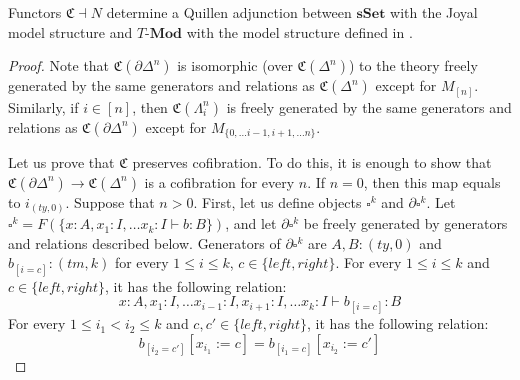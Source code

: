 \documentclass[reqno]{amsart}
\theoremstyle{definition}
\theoremstyle{remark}
\newcommand{\repl}{:=}
\newcommand{\cat}[1]{\mathbf{#1}}
\newcommand{\Mod}[1]{#1\text{-}\cat{Mod}}
\newcommand{\sSet}{\cat{sSet}}
\numberwithin{figure}{section}
\begin{document}
\begin{prop}
Functors $\mathfrak{C} \dashv N$ determine a Quillen adjunction between $\sSet$ with the Joyal model structure and $\Mod{T}$ with the model structure defined in \cite{alg-models}.
\end{prop}
\begin{proof}
Note that $\mathfrak{C}(\partial \Delta^n)$ is isomorphic (over $\mathfrak{C}(\Delta^n)$) to the theory
freely generated by the same generators and relations as $\mathfrak{C}(\Delta^n)$ except for $M_{[n]}$.
Similarly, if $i \in [n]$, then $\mathfrak{C}(\Lambda^n_i)$ is freely generated by the same generators
and relations as $\mathfrak{C}(\partial \Delta^n)$ except for $M_{\{ 0, \ldots i-1, i+1, \ldots n \}}$.

Let us prove that $\mathfrak{C}$ preserves cofibration.
To do this, it is enough to show that $\mathfrak{C}(\partial \Delta^n) \to \mathfrak{C}(\Delta^n)$ is a cofibration for every $n$.
If $n = 0$, then this map equals to $i_{(ty,0)}$.
Suppose that $n > 0$.
First, let us define objects $\square^k$ and $\partial \square^k$.
Let $\square^k = F(\{ x : A, x_1 : I, \ldots x_k : I \vdash b : B \})$,
and let $\partial \square^k$ be freely generated by generators and relations described below.
Generators of $\partial \square^k$ are $A,B : (ty,0)$ and $b_{[i=c]} : (tm,k)$ for every $1 \leq i \leq k$, $c \in \{left,right\}$.
For every $1 \leq i \leq k$ and $c \in \{left,right\}$, it has the following relation:
\[ x : A, x_1 : I, \ldots x_{i-1} : I, x_{i+1} : I, \ldots x_k : I \vdash b_{[i=c]} : B \]
For every $1 \leq i_1 < i_2 \leq k$ and $c,c' \in \{left,right\}$, it has the following relation:
\[ b_{[i_2=c']}[x_{i_1} \repl c] = b_{[i_1=c]}[x_{i_2} \repl c'] \]


\end{proof}
\end{document}

